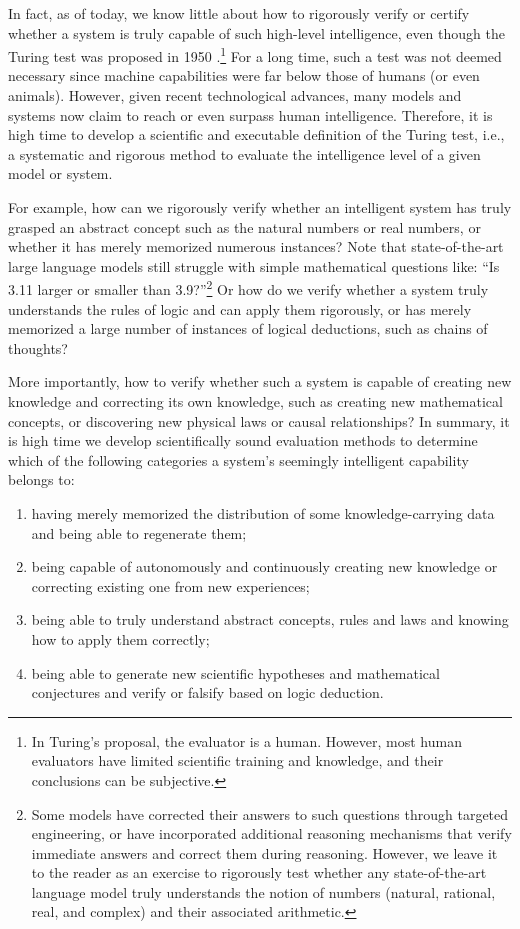 \documentclass[../../book-main.tex]{subfiles}
\begin{document}
In fact, as of today, we know little about how to rigorously verify or certify whether a system is truly capable of such high-level intelligence, even though the Turing test was proposed in 1950 \cite{Turing-1950}.\footnote{In Turing's proposal, the evaluator is a human. However, most human evaluators have limited scientific training and knowledge, and their conclusions can be subjective.} For a long time, such a test was not deemed necessary since machine capabilities were far below those of humans (or even animals). However, given recent technological advances, many models and systems now claim to reach or even surpass human intelligence. Therefore, it is high time to develop a scientific and executable definition of the Turing test, i.e., a systematic and rigorous method to evaluate the intelligence level of a given model or system. 

For example, how can we rigorously verify whether an intelligent system has truly grasped an abstract concept such as the natural numbers or real numbers, or whether it has merely memorized numerous instances? Note that state-of-the-art large language models still struggle with simple mathematical questions like: ``Is 3.11 larger or smaller than 3.9?''\footnote{Some models have corrected their answers to such questions through targeted engineering, or have incorporated additional reasoning mechanisms that verify immediate answers and correct them during reasoning. However, we leave it to the reader as an exercise to rigorously test whether any state-of-the-art language model truly understands the notion of numbers (natural, rational, real, and complex) and their associated arithmetic.} 
Or how do we verify whether a system truly understands the rules of logic and can apply them rigorously, or has merely memorized a large number of instances of logical deductions, such as chains of thoughts? 

More importantly, how to verify whether such a system is capable of creating new knowledge and correcting its own knowledge, such as creating new mathematical concepts, or discovering new physical laws or causal relationships? In summary, it is high time we develop scientifically sound  evaluation methods to determine which of the following categories a system's seemingly intelligent capability belongs to:
\begin{enumerate}
    \item having merely memorized the distribution of some knowledge-carrying data and being able to regenerate them;
    \item being capable of autonomously and continuously creating new knowledge or correcting existing one from new experiences;
    \item being able to truly  understand abstract concepts, rules and laws and knowing how to apply them correctly;
    \item being able to generate new scientific hypotheses and mathematical conjectures and verify or falsify based on logic deduction.
\end{enumerate}
\end{document}
